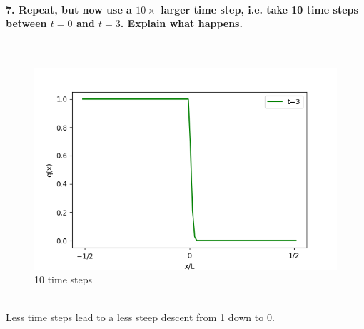 \paragraph{7. Repeat, but now use a $10\times$ larger time 
    step, i.e. take 10 time steps between $t=0$ and $t=3$. 
    Explain what happens.
} \ \\
    \begin{figure}[h!]
        \centering
        \includegraphics[width=.6\textwidth]{../figures/upwind_7.png}
        \caption{10 time steps}
    \end{figure} \ \\ 
    Less time steps lead to a less steep descent 
    from 1 down to 0.

